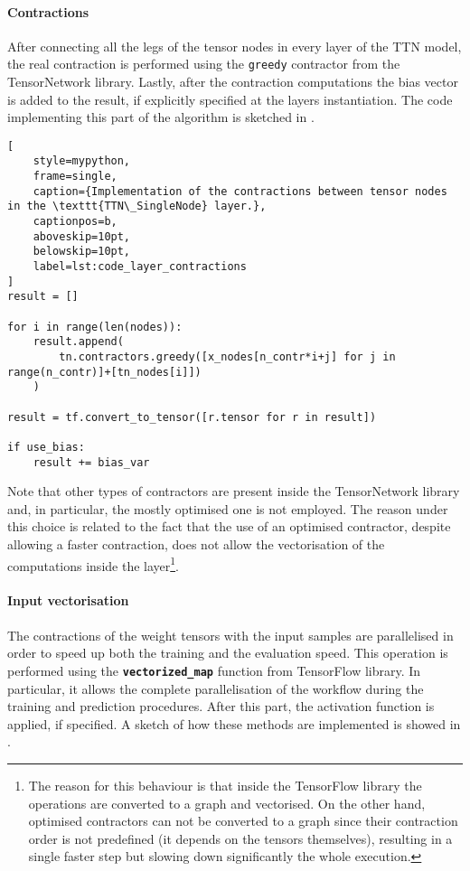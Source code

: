 \documentclass[../main/main.tex]{subfiles}
\begin{document}
\paragraph{Contractions}
After connecting all the legs of the tensor nodes in every layer of the TTN model, the real contraction is performed using the \texttt{greedy} contractor from the TensorNetwork library. Lastly, after the contraction computations the bias vector is added to the result, if explicitly specified at the layers instantiation. The code implementing this part of the algorithm is sketched in .


\begin{lstlisting}[
    style=mypython,
    frame=single,
    caption={Implementation of the contractions between tensor nodes in the \texttt{TTN\_SingleNode} layer.},
    captionpos=b,
    aboveskip=10pt,
    belowskip=10pt,
    label=lst:code_layer_contractions
]
result = []

for i in range(len(nodes)):
    result.append(
        tn.contractors.greedy([x_nodes[n_contr*i+j] for j in range(n_contr)]+[tn_nodes[i]])
    )

result = tf.convert_to_tensor([r.tensor for r in result])

if use_bias:
    result += bias_var
\end{lstlisting}


Note that other types of contractors are present inside the TensorNetwork library and, in particular, the mostly optimised one is not employed. The reason under this choice is related to the fact that the use of an optimised contractor, despite allowing a faster contraction, does not allow the vectorisation of the computations inside the layer\footnote{The reason for this behaviour is that inside the TensorFlow library the operations are converted to a graph and vectorised. On the other hand, optimised contractors can not be converted to a graph since their contraction order is not predefined (it depends on the tensors themselves), resulting in a single faster step but slowing down significantly the whole execution.}.


\paragraph{Input vectorisation}
The contractions of the weight tensors with the input samples are parallelised in order to speed up both the training and the evaluation speed. This operation is performed using the \texttt{\bfseries vectorized\_map} function from TensorFlow library. In particular, it allows the complete parallelisation of the workflow during the training and prediction procedures. After this part, the activation function is applied, if specified. A sketch of how these methods are implemented is showed in .
\end{document}
